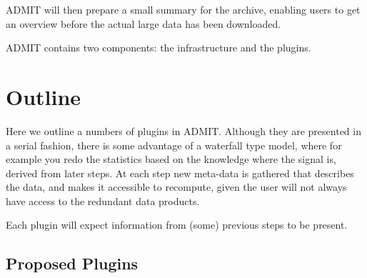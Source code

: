 \documentclass[preprint]{aastex} %
\begin{document}
ADMIT will then prepare a small summary for the archive, enabling users
to get an overview before the actual large data has been downloaded.

ADMIT contains two components: the infrastructure and the plugins.


\section{Outline}

Here we outline a numbers of plugins in ADMIT. Although they are
presented in a serial fashion, there is some advantage of a waterfall
type model, where for example you redo the statistics based on 
the knowledge where
the signal is, derived from later steps. At each step new meta-data is
gathered that describes the data, and makes it accessible to recompute, 
given the user will not always have access to the redundant data products.

Each plugin will expect information from (some) previous steps to be present.


\subsection{Proposed Plugins}
\end{document}
